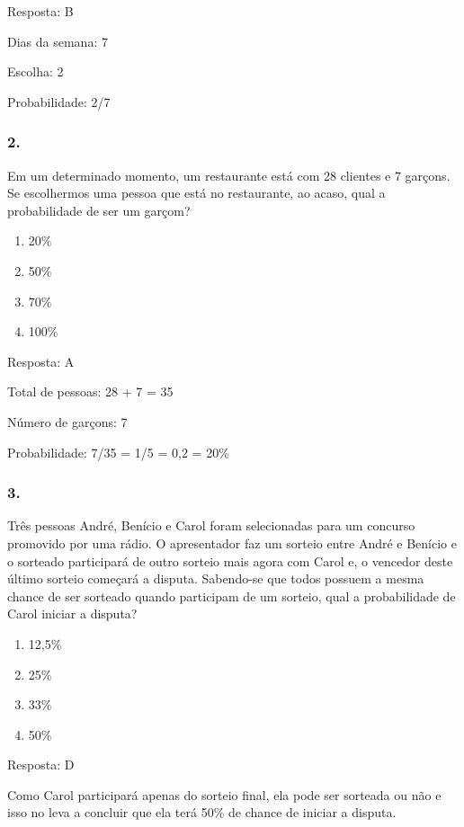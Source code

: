 Resposta: B

Dias da semana: 7

Escolha: 2

Probabilidade: 2/7

\subsubsection{2.}\label{section-106}

Em um determinado momento, um restaurante está com 28 clientes e 7
garçons. Se escolhermos uma pessoa que está no restaurante, ao acaso,
qual a probabilidade de ser um garçom?

\begin{enumerate}
\def\labelenumi{\alph{enumi})}
\item
  20\%
\item
  50\%
\item
  70\%
\item
  100\%
\end{enumerate}

Resposta: A

Total de pessoas: 28 + 7 = 35

Número de garçons: 7

Probabilidade: 7/35 = 1/5 = 0,2 = 20\%

\subsubsection{3.}\label{section-107}

Três pessoas André, Benício e Carol foram selecionadas para um concurso
promovido por uma rádio. O apresentador faz um sorteio entre André e
Benício e o sorteado participará de outro sorteio mais agora com Carol
e, o vencedor deste último sorteio começará a disputa. Sabendo-se que
todos possuem a mesma chance de ser sorteado quando participam de um
sorteio, qual a probabilidade de Carol iniciar a disputa?

\begin{enumerate}
\def\labelenumi{\alph{enumi})}
\item
  12,5\%
\item
  25\%
\item
  33\%
\item
  50\%
\end{enumerate}

Resposta: D

Como Carol participará apenas do sorteio final, ela pode ser sorteada ou
não e isso no leva a concluir que ela terá 50\% de chance de iniciar a
disputa.

